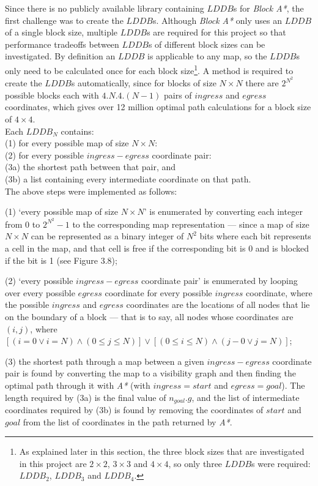 \documentclass[12pt,notitlepage]{report}
\begin{document}
\noindent
Since there is no publicly available library containing $LDDB$s for {\em Block A*}, the first challenge was to create the $LDDB$s. Although {\em Block A*} only uses an $LDDB$ of a single block size, multiple $LDDB$s are required for this project so that performance tradeoffs between $LDDB$s of different block sizes can be investigated. By definition an $LDDB$ is applicable to any map, so the $LDDB$s only need to be calculated once for each block size\footnote{As explained later in this section, the three block sizes that are investigated in this project are $2 \times 2$, $3 \times 3$ and $4 \times 4$, so only three $LDDB$s were required: $LDDB_{2}$, $LDDB_{3}$ and $LDDB_{4}$.}. A method is required to create the $LDDB$s automatically, since for blocks of size {$N \times N$} there are $2^{N^{2}}$ possible blocks each with $4.N.4.(N-1)$ pairs of $ingress$ and $egress$ coordinates, which gives over 12 million optimal path calculations for a block size of $4 \times 4$.\\

\noindent
Each $LDDB_{N}$ contains:\\
(1) \indent for every possible map of size $N \times N$:\\
(2) \indent \indent for every possible $ingress-egress$ coordinate pair:\\
(3a) \indent \indent \indent the shortest path between that pair, and\\
(3b) \indent \indent \indent a list containing every intermediate coordinate on that path.\\

\noindent
The above steps were implemented as follows:
\begin{description}
\item (1) `every possible map of size $N \times N$' is enumerated by converting each integer from $0$ to $2^{N^{2}}-1$ to the corresponding map representation --- since a map of size $N \times N$ can be represented as a binary integer of $N^{2}$ bits where each bit represents a cell in the map, and that cell is free if the corresponding bit is 0 and is blocked if the bit is 1 (see Figure 3.8);
\item (2) `every possible $ingress-egress$ coordinate pair' is enumerated by looping over every possible $egress$ coordinate for every possible $ingress$ coordinate, where the possible $ingress$ and $egress$ coordinates are the locations of all nodes that lie on the boundary of a block --- that is to say, all nodes whose coordinates are $(i,j)$, where $[(i=0 \lor i=N) \land (0\leq j \leq N)] \lor [(0\leq i \leq N) \land (j-0 \lor j=N)]$;
\item (3) the shortest path through a map between a given $ingress-egress$ coordinate pair is found by converting the map to a visibility graph and then finding the optimal path through it with {\em A*} (with $ingress = start$ and $egress=goal$). The length required by (3a) is the final value of $n_{goal}.g$, and the list of intermediate coordinates required by (3b) is found by removing the coordinates of $start$ and $goal$ from the list of coordinates in the path returned by {\em A*}.
\end{description}
\end{document}

